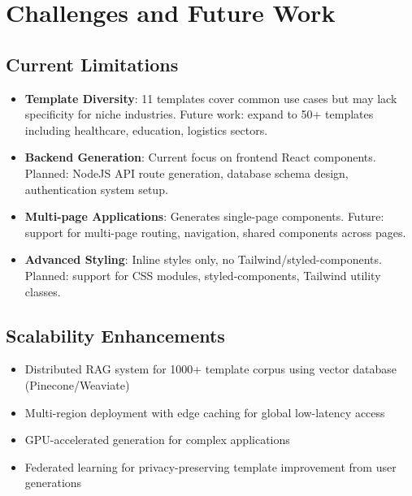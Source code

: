 \documentclass[10pt, conference, letterpaper]{IEEEtran}
\begin{document}
\section{Challenges and Future Work}
\subsection{Current Limitations}
\begin{itemize}
    \item \textbf{Template Diversity}: 11 templates cover common use cases but may lack specificity for niche industries. Future work: expand to 50+ templates including healthcare, education, logistics sectors.
    \item \textbf{Backend Generation}: Current focus on frontend React components. Planned: NodeJS API route generation, database schema design, authentication system setup.
    \item \textbf{Multi-page Applications}: Generates single-page components. Future: support for multi-page routing, navigation, shared components across pages.
    \item \textbf{Advanced Styling}: Inline styles only, no Tailwind/styled-components. Planned: support for CSS modules, styled-components, Tailwind utility classes.
\end{itemize}

\subsection{Scalability Enhancements}
\begin{itemize}
    \item Distributed RAG system for 1000+ template corpus using vector database (Pinecone/Weaviate)
    \item Multi-region deployment with edge caching for global low-latency access
    \item GPU-accelerated generation for complex applications
    \item Federated learning for privacy-preserving template improvement from user generations
\end{itemize}
\end{document}
